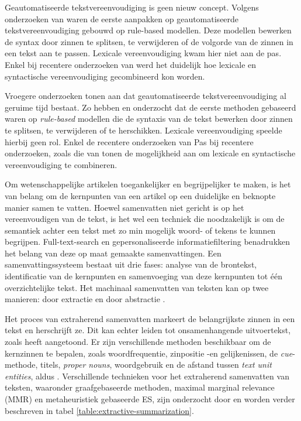 \medspace

Geautomatiseerde tekstvereenvoudiging is geen nieuw concept. Volgens onderzoeken van \textcite{Canning2000, Siddharthan2006} waren de eerste aanpakken op geautomatiseerde tekstvereenvoudiging gebouwd op rule-based modellen. Deze modellen bewerken de syntax door zinnen te splitsen, te verwijderen of de volgorde van de zinnen in een tekst aan te passen. Lexicale vereenvoudiging kwam hier niet aan de pas. Enkel bij recentere onderzoeken van \textcite{Coster2011, Bulte2018} werd het duidelijk hoe lexicale en syntactische vereenvoudiging gecombineerd kon worden.

\medspace

Vroegere onderzoeken tonen aan dat geautomatiseerde tekstvereenvoudiging al geruime tijd bestaat. Zo hebben \textcite{Canning2000} en \textcite{Siddharthan2006} onderzocht dat de eerste methoden gebaseerd waren op \textit{rule-based} modellen die de syntaxis van de tekst bewerken door zinnen te splitsen, te verwijderen of te herschikken. Lexicale vereenvoudiging speelde hierbij geen rol. Enkel de recentere onderzoeken van  Pas bij recentere onderzoeken, zoals die van \textcite{Coster2011, Bulte2018} tonen de mogelijkheid aan om lexicale en syntactische vereenvoudiging te combineren.

\medspace

Om wetenschappelijke artikelen toegankelijker en begrijpelijker te maken, is het van belang om de kernpunten van een artikel op een duidelijke en beknopte manier samen te vatten. Hoewel samenvatten niet gericht is op het vereenvoudigen van de tekst, is het wel een techniek die noodzakelijk is om de semantiek achter een tekst met zo min mogelijk woord- of tekens te kunnen begrijpen. Full-text-search en gepersonaliseerde informatiefiltering benadrukken het belang van deze op maat gemaakte samenvattingen. Een samenvattingssysteem bestaat uit drie fases: analyse van de brontekst, identificatie van de kernpunten en samenvoeging van deze kernpunten tot één overzichtelijke tekst. Het machinaal samenvatten van teksten kan op twee manieren: door extractie en door abstractie \autocite{Hahn2000, Dubay2004}.

\medspace

Het proces van extraherend samenvatten markeert de belangrijkste zinnen in een tekst en herschrijft ze. Dit kan echter leiden tot onsamenhangende uitvoertekst, zoals \textcite{Khan2014} heeft aangetoond. Er zijn verschillende methoden beschikbaar om de kernzinnen te bepalen, zoals woordfrequentie, zinpositie -en gelijkenissen, de \textit{cue}-methode, titels, \textit{proper nouns}, woordgebruik en de afstand tussen \textit{text unit entities}, aldus \textcite{Khan2014}. Verschillende technieken voor het extraherend samenvatten van teksten, waaronder graafgebaseerde methoden, maximal marginal relevance (MMR) en metaheuristiek gebaseerde ES, zijn onderzocht door \textcite{Verma2020} en worden verder beschreven in tabel \ref{table:extractive-summarization}.

